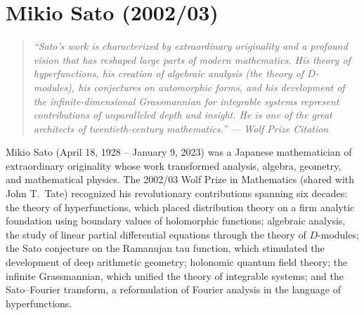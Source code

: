 \let\R\relax
\newcommand{\R}{\mathbb{R}}
\let\C\relax
\newcommand{\C}{\mathbb{C}}
\let\N\relax
\newcommand{\N}{\mathbb{N}}
\let\Z\relax
\newcommand{\Z}{\mathbb{Z}}
\let\Q\relax
\newcommand{\Q}{\mathbb{Q}}
\let\SO\relax
\newcommand{\SO}{\operatorname{SO}}
\let\SL\relax
\newcommand{\SL}{\operatorname{SL}}
\let\GL\relax
\newcommand{\GL}{\operatorname{GL}}
\let\St\relax
\newcommand{\St}{\operatorname{St}}
\let\GV\relax
\newcommand{\GV}{\operatorname{GV}}
\let\E\relax
\newcommand{\E}{\operatorname{E}}
\let\SU\relax
\newcommand{\SU}{\operatorname{SU}}
\let\Hom\relax
\newcommand{\Hom}{\operatorname{Hom}}
\let\Ch\relax
\newcommand{\Ch}{\operatorname{Ch}}
\let\Gr\relax
\newcommand{\Gr}{\operatorname{Gr}}
\let\Det\relax
\newcommand{\Det}{\operatorname{Det}}

\chapter{Mikio Sato (2002/03)}

\begin{quote}
\it ``Sato's work is characterized by extraordinary originality and a profound vision that has reshaped large parts of modern mathematics. His theory of hyperfunctions, his creation of algebraic analysis (the theory of \(D\)-modules), his conjectures on automorphic forms, and his development of the infinite-dimensional Grassmannian for integrable systems represent contributions of unparalleled depth and insight. He is one of the great architects of twentieth-century mathematics.'' --- Wolf Prize Citation
\end{quote}

Mikio Sato (April 18, 1928 -- January 9, 2023) was a Japanese mathematician of extraordinary originality whose work transformed analysis, algebra, geometry, and mathematical physics. The 2002/03 Wolf Prize in Mathematics (shared with John T.\ Tate) recognized his revolutionary contributions spanning six decades: the theory of hyperfunctions, which placed distribution theory on a firm analytic foundation using boundary values of holomorphic functions; algebraic analysis, the study of linear partial differential equations through the theory of \(D\)-modules; the Sato conjecture on the Ramanujan tau function, which stimulated the development of deep arithmetic geometry; holonomic quantum field theory; the infinite Grassmannian, which unified the theory of integrable systems; and the Sato--Fourier transform, a reformulation of Fourier analysis in the language of hyperfunctions.

